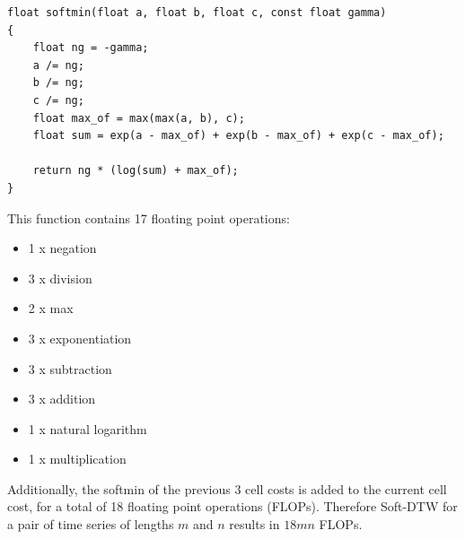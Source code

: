 \documentclass[12pt, letterpaper]{article}
\begin{document}
\begin{verbatim}
float softmin(float a, float b, float c, const float gamma)
{
    float ng = -gamma;
    a /= ng;
    b /= ng;
    c /= ng;
    float max_of = max(max(a, b), c);
    float sum = exp(a - max_of) + exp(b - max_of) + exp(c - max_of);

    return ng * (log(sum) + max_of);
}
\end{verbatim}

This function contains 17 floating point operations:

\begin{itemize}
  \item 1 x negation
  \item 3 x division
  \item 2 x max
  \item 3 x exponentiation
  \item 3 x subtraction
  \item 3 x addition
  \item 1 x natural logarithm
  \item 1 x multiplication
\end{itemize}

Additionally, the softmin of the previous 3 cell costs is added to the current
cell cost, for a total of 18 floating point operations (FLOPs). Therefore
Soft-DTW for a pair of time series of lengths $m$ and $n$ results in $18mn$
FLOPs.
\end{document}
